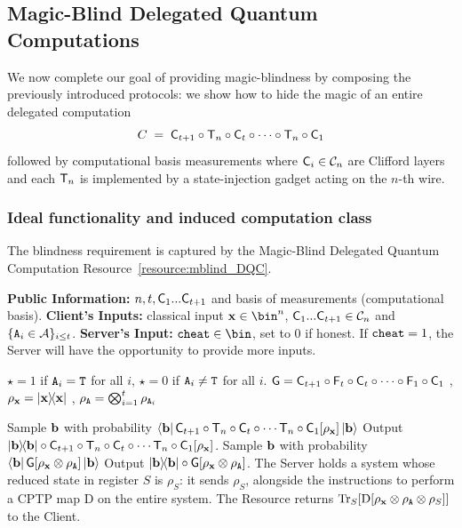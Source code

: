 \subsection{Magic-Blind Delegated Quantum Computations}
\label{subsection:blind:MB-DQC}
We now complete our goal of providing magic-blindness by composing the previously introduced protocols: we show how to hide the magic of an entire delegated computation $$C \;=\; \mathsf{C}_{t+1}\circ \mathsf{T}_n \circ \mathsf{C}_t \circ \cdots \circ \mathsf{T}_n \circ \mathsf{C}_1$$ followed by computational basis measurements where $\mathsf{C}_i\in\mathcal{C}_n$ are Clifford layers and each $\mathsf{T}_n$ is implemented by a state-injection gadget acting on the $n$-th wire.
\subsubsection{Ideal functionality and induced computation class}
The blindness requirement is captured by the Magic-Blind Delegated Quantum Computation Resource~\ref{resource:mblind_DQC}.
\begin{resourcee}
    \caption{Magic-Blind DQC}
    \label{resource:mblind_DQC}
    \begin{algorithmic}[0]
        \State \textbf{Public Information:} $n, t, \mathsf{C}_1...\mathsf{C}_{t+1}$ and basis of measurements (computational basis).
        \State \textbf{Client's Inputs:} classical input $\x\in\bin^n$, $\mathsf{C}_1...\mathsf{C}_{t+1}\in\mathcal{C}_n$ and $\{\mathtt{A}_i\in\mathcal A\}_{i\leq t}$.
        \State \textbf{Server's Input:} $\c\in\bin$, set to $0$ if honest. If $\mathtt{cheat}=1$, the Server will have the opportunity to provide more inputs.

        \State  $\star=1$ if $\mathtt{A}_i=\mathtt{T}$ for all $i$, $\star=0$ if $\mathtt{A}_i\neq \mathtt{T}$ for all $i$.
        \State  $\mathsf{G}=\mathsf{C}_{t+1}
        \circ \mathsf{F}_t\circ \mathsf{C}_t
        \circ \cdots
        \circ \mathsf{F}_1\circ \mathsf{C}_1$
        ,  $\rho_\x=\ketbra \x$
        ,  $\rho_{\mathtt{A}}=\bigotimes_{i=1}^t\rho_{\mathtt{A}_i}$
        \EndProcedure

        \If{$\star$}
        \State Sample $\mathbf b$ with probability $\bra {\mathbf b} \mathsf{C}_{t+1}
        \circ
        \mathsf{T}_n\circ \mathsf{C}_t \circ \cdots \mathsf{T}_n\circ \mathsf{C}_1[\rho_\mathbf x]\ket {\mathbf b}$
        \State Output $
       \ketbra\b
        \circ
        \C_{t+1}
        \circ
        \T_n\circ \C_t \circ \cdots \T_n\circ \C_1[\rho_\x]
        $.
        \Else{}
        \State Sample $\mathbf b$ with probability $\bra {\mathbf b} \mathsf{G}[\rho_\mathbf x\otimes \rho_{\mathtt{A}}] \ket {\mathbf b}$
        \State Output $
        \ketbra\b
        \circ
        \G[\rho_\x\otimes \rho_\A]
        $.
        \EndIf
        \Else
        \State The Server holds a system whose reduced state in register $S$ is $\rho_S$: it sends $\rho_S$, alongside the instructions to perform a CPTP map $\mathrm D$ on the entire system. The Resource returns $\Tr_S[\mathrm D[\rho_\mathbf x\otimes \rho_{\mathtt{A}}\otimes \rho_S]]$ to the Client.
        \EndIf
        \EndProcedure
    \end{algorithmic}
\end{resourcee}
